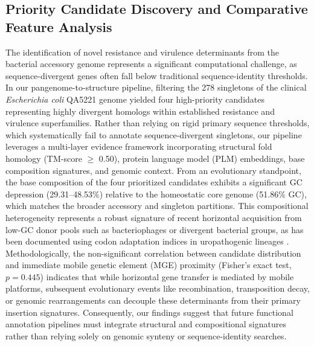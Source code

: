 \documentclass[pdflatex,sn-mathphys-num]{sn-jnl}
\begin{document}
\subsection{Priority Candidate Discovery and Comparative Feature Analysis}
The identification of novel resistance and virulence determinants from the bacterial accessory genome represents a significant computational challenge, as sequence-divergent genes often fall below traditional sequence-identity thresholds. In our pangenome-to-structure pipeline, filtering the 278 singletons of the clinical \textit{Escherichia coli} QA5221 genome yielded four high-priority candidates representing highly divergent homologs within established resistance and virulence superfamilies. Rather than relying on rigid primary sequence thresholds, which systematically fail to annotate sequence-divergent singletons, our pipeline leverages a multi-layer evidence framework incorporating structural fold homology (TM-score $\ge$ 0.50), protein language model (PLM) embeddings, base composition signatures, and genomic context. From an evolutionary standpoint, the base composition of the four prioritized candidates exhibits a significant GC depression (29.31--48.53\%) relative to the homeostatic core genome (51.86\% GC), which matches the broader accessory and singleton partitions. This compositional heterogeneity represents a robust signature of recent horizontal acquisition from low-GC donor pools such as bacteriophages or divergent bacterial groups, as has been documented using codon adaptation indices in uropathogenic lineages \cite{silva2022evolutionary,ghalayini2022distinct}. Methodologically, the non-significant correlation between candidate distribution and immediate mobile genetic element (MGE) proximity (Fisher's exact test, $p = 0.445$) indicates that while horizontal gene transfer is mediated by mobile platforms, subsequent evolutionary events like recombination, transposition decay, or genomic rearrangements can decouple these determinants from their primary insertion signatures. Consequently, our findings suggest that future functional annotation pipelines must integrate structural and compositional signatures rather than relying solely on genomic synteny or sequence-identity searches. 
\end{document}
